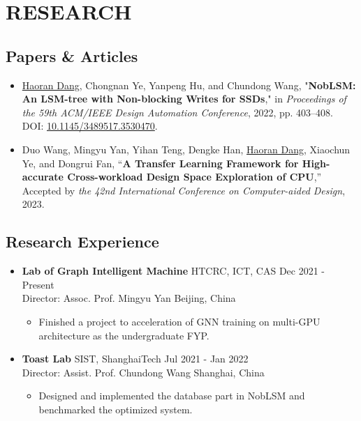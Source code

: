\documentclass[a4paper,10pt]{ctexart} %
\begin{document}
\section{RESEARCH}

    \subsection{Papers \& Articles}

        \begin{itemize}
            \item \underline{Haoran Dang}, Chongnan Ye, Yanpeng Hu, and Chundong Wang, "\textbf{NobLSM: An LSM-tree with Non-blocking Writes for SSDs}," in \textit{Proceedings of the 59th ACM/IEEE Design Automation Conference}, 2022, pp. 403–408. DOI: \href{https://doi.org/10.1145/3489517.3530470}{10.1145/3489517.3530470}.
            \item Duo Wang, Mingyu Yan, Yihan Teng, Dengke Han, \underline{Haoran Dang}, Xiaochun Ye, and Dongrui Fan, “\textbf{A Transfer Learning Framework for High-accurate Cross-workload Design Space Exploration of CPU},” Accepted by \textit{the 42nd International Conference on Computer-aided Design}, 2023.
        \end{itemize}

    \subsection{Research Experience}

    \begin{itemize}
        \item \textbf{Lab of Graph Intelligent Machine} \quad HTCRC, ICT, CAS \hfill Dec 2021 - Present \\
        {\small Director: Assoc. Prof. Mingyu Yan} \hfill Beijing, China
        \begin{small}
            \begin{itemize}
                \item Finished a project to acceleration of GNN training on multi-GPU architecture as the undergraduate FYP.
            \end{itemize}
        \end{small}
    \end{itemize}

    \begin{itemize}
        \item \textbf{Toast Lab} \quad SIST, ShanghaiTech \hfill Jul 2021 - Jan 2022 \\
        {\small Director: Assist. Prof. Chundong Wang} \hfill Shanghai, China
        \begin{small}
            \begin{itemize}
                \item Designed and implemented the database part in NobLSM and benchmarked the optimized system.
            \end{itemize}
        \end{small}
    \end{itemize}
\end{document}
